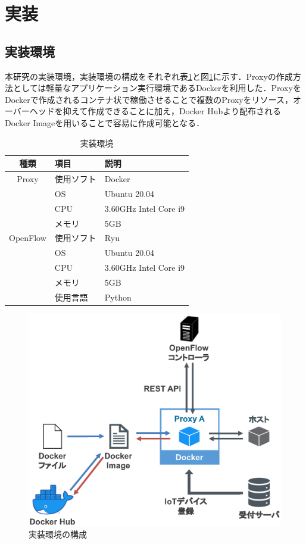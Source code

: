 \documentclass[Japanese]{dicomopapers}
\begin{document}
\section{実装}
\subsection{実装環境}
本研究の実装環境，実装環境の構成をそれぞれ表\ref{tab:program}と図\ref{fig:program}に示す．Proxyの作成方法としては軽量なアプリケーション実行環境であるDockerを利用した．ProxyをDockerで作成されるコンテナ状で稼働させることで複数のProxyをリソース，オーバーヘッドを抑えて作成できることに加え，Docker Hubより配布されるDocker Imageを用いることで容易に作成可能となる．

\begin{table}[!bt]
	\caption{実装環境}
	\label{tab:program}
	\centering
	\begin{tabular}{|c|l|l|}
		\hline
		種類     & 項目       & 説明                  \\
		\hline \hline
		Proxy    & 使用ソフト & Docker                \\
		         & OS         & Ubuntu 20.04          \\
		         & CPU        & 3.60GHz Intel Core i9 \\
		         & メモリ     & 5GB                   \\
		\hline
		OpenFlow & 使用ソフト & Ryu                   \\
		         & OS         & Ubuntu 20.04          \\
		         & CPU        & 3.60GHz Intel Core i9 \\
		         & メモリ     & 5GB                   \\
		         & 使用言語   & Python                \\
		\hline
	\end{tabular}
\end{table}

\begin{figure}[!tb]
	\centering
	\includegraphics[width=\linewidth]{img/program.eps}
	\caption{実装環境の構成}
	\label{fig:program}
\end{figure}
\end{document}

